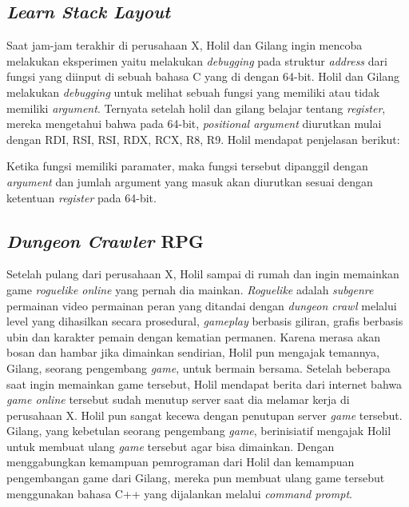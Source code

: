 \documentclass[../main.tex]{subfiles}
\begin{document}
\subsection{\textit{Learn Stack Layout}}
Saat jam-jam terakhir di perusahaan X, Holil dan Gilang ingin mencoba melakukan eksperimen yaitu melakukan \textit{debugging} pada struktur \textit{address} dari fungsi yang diinput di sebuah bahasa C yang di {\compile} dengan 64-bit. Holil dan Gilang melakukan \textit{debugging} untuk melihat sebuah fungsi yang memiliki atau tidak memiliki \textit{argument}. Ternyata setelah holil dan gilang belajar tentang \textit{register}, mereka mengetahui bahwa pada 64-bit, \textit{positional argument} diurutkan mulai dengan RDI, RSI, RSI, RDX, RCX, R8, R9. Holil mendapat penjelasan berikut:

Ketika fungsi memiliki paramater, maka fungsi tersebut dipanggil dengan \textit{argument} dan jumlah argument yang masuk akan diurutkan sesuai dengan ketentuan \textit{register} pada 64-bit.



\subsection{\textit{Dungeon Crawler} RPG}

Setelah pulang dari perusahaan X, Holil sampai di rumah dan ingin memainkan game \textit{roguelike online} yang pernah dia mainkan. \textit{Roguelike} adalah \textit{subgenre} permainan video permainan peran yang ditandai dengan \textit{dungeon crawl} melalui level yang dihasilkan secara prosedural, \textit{gameplay} berbasis giliran, grafis berbasis ubin dan karakter pemain dengan kematian permanen. Karena merasa akan bosan dan hambar jika dimainkan sendirian, Holil pun mengajak temannya, Gilang, seorang pengembang \textit{game}, untuk bermain bersama. Setelah beberapa saat ingin memainkan game tersebut, Holil mendapat berita dari internet bahwa \textit{game online} tersebut sudah menutup server saat dia melamar kerja di perusahaan X. Holil pun sangat kecewa dengan penutupan server \textit{game} tersebut. Gilang, yang kebetulan seorang pengembang \textit{game}, berinisiatif mengajak Holil untuk membuat ulang \textit{game} tersebut agar bisa dimainkan. Dengan menggabungkan kemampuan pemrograman dari Holil dan kemampuan pengembangan game dari Gilang, mereka pun membuat ulang game tersebut menggunakan bahasa C++ yang dijalankan melalui \textit{command prompt}.
\end{document}
